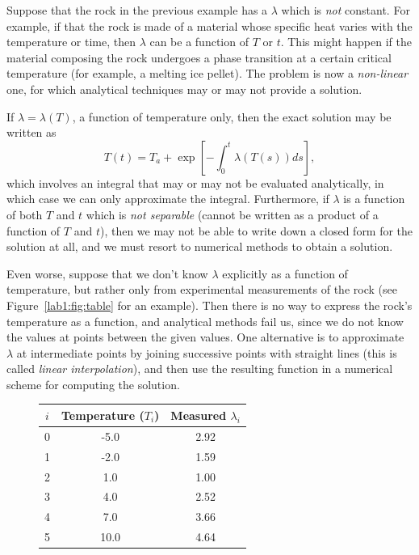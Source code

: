 \begin{example}
  \label{lab1:exm:conduction-nonlinear}
  Suppose that the rock in the previous example has a $\lambda$
  which is \emph{not} constant.  For example, if
  that the rock is made of a material whose specific heat varies with
  the temperature or time, then $\lambda$ can be a function of $T$ or
  $t$.  
  This might happen if the material composing the
  rock undergoes a phase transition at a certain critical temperature
  (for example, a melting ice pellet).  
  The problem is now a \emph{non-linear} one, for which analytical
  techniques may or may not provide a solution.

  If $\lambda=\lambda(T)$, a function of temperature only, then the
  exact solution may be written as 
  \[ 
  T(t) = T_a + \exp{\left[-\int^{t}_{0} \lambda(T(s))ds \right]},
  \]
  which involves an integral that may or may not be evaluated
  analytically, in which case we can only approximate the integral.  
  Furthermore, if $\lambda$ is a function of both $T$ and $t$ which is
  \emph{not separable} (\ie cannot be written as a product of a
  function of $T$ and $t$), then we may not be able to write down a
  closed form for the solution at all, and we must resort to
  numerical methods to obtain a solution.

  Even worse, suppose that we don't know $\lambda$ explicitly as a
  function of temperature, but rather only from experimental
  measurements of the rock (see Figure~\ref{lab1:fig:table} for an
  example).   
  Then there is no way to express the rock's temperature as a
  function, and analytical methods fail us, since we do not know the
  values at points between the given values.
  One alternative is to approximate $\lambda$ at intermediate points by
  joining successive points with 
  straight lines (this is called \emph{linear interpolation}), and then
  use the resulting function in a numerical scheme for computing the
  solution. 

  \begin{figure}[htbp]
    {\large
    \begin{center}
      \leavevmode
      \begin{tabular}{|c|c|c|}\hline
        $i$ & Temperature ($T_i$) & Measured $\lambda_i$ \\ \hline
        0 & -5.0 & 2.92 \\
        1 & -2.0 & 1.59 \\
        2 &  1.0 & 1.00 \\
        3 &  4.0 & 2.52 \\
        4 &  7.0 & 3.66 \\
        5 & 10.0 & 4.64 \\ \hline
      \end{tabular}
    \end{center}
    }


\end{figure}
\end{example}
